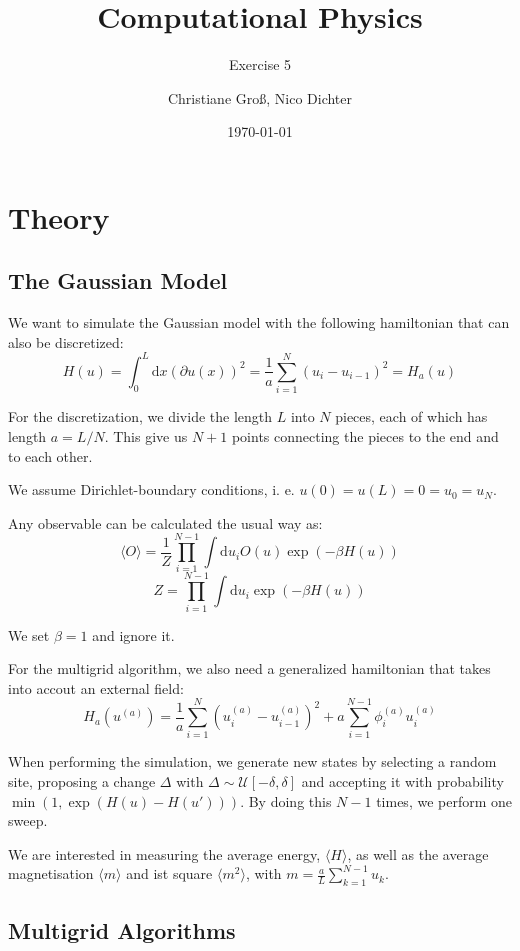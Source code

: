 \documentclass{scrartcl}
\title{Computational Physics}
\subtitle{Exercise 5}
\date{\today}
\author{Christiane Groß, Nico Dichter}
\begin{document}
	\maketitle
	
\section{Theory}
\subsection{The Gaussian Model}

We want to simulate the Gaussian model with the following hamiltonian that can also be discretized:
\[
H(u)=\int_{0}^{L}\mathrm{d}x\left(\partial{u(x)} \right)^2=\frac{1}{a}\sum_{i=1}^{N}\left(u_i-u_{i-1} \right)^2=H_a(u)
\]

For the discretization, we divide the length $L$ into $N$ pieces, each of which has length $a=L/N$. This give us $N+1$ points connecting the pieces to the end and to each other. 

We assume Dirichlet-boundary conditions, i.\! e.\! $u(0)=u(L)=0=u_0=u_N$.

Any observable can be calculated the usual way as: \[
\langle O\rangle=\frac{1}{Z}\prod_{i=1}^{N-1}\int\mathrm{d}u_i O(u)\exp(-\beta H(u)) \]
\[
Z=\prod_{i=1}^{N-1}\int\mathrm{d}u_i\exp(-\beta H(u)) 
\]

We set $\beta=1$ and ignore it.

For the multigrid algorithm, we also need a generalized hamiltonian that takes into accout an external field:
\[
H_a(u^{(a)})=\frac{1}{a}\sum_{i=1}^N
\left( u_i^{(a)}-u_{i-1}^{(a)}\right) ^2+a\sum_{i=1}^{N-1}\phi_i^{(a)}u_i^{(a)}
\]

When performing the simulation, we generate new states by selecting a random site, proposing a change $\Delta$ with $\Delta\sim\mathcal{U}[-\delta, \delta]$ and accepting it with probability $\min(1, \exp(H(u)-H(u')))$. By doing this $N-1$ times, we perform one sweep.

We are interested in measuring the average energy, $\langle H\rangle$, as well as the average magnetisation $\langle m \rangle$ and ist square $\langle m^2\rangle$, with $m=\frac{a}{L}\sum_{k=1}^{N-1}u_k$.

\subsection{Multigrid Algorithms}
\end{document}
